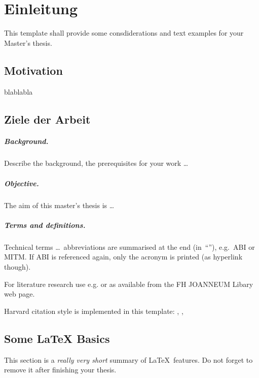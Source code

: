 \chapter{Einleitung}\label{chap:introduction}
\chapterstart

This template shall provide some consdiderations and text examples for your Master's thesis.
\section{Motivation}
blablabla
\section{Ziele der Arbeit}
\paragraph{Background.}
Describe the background, the prerequisites for your work \ldots


\paragraph{Objective.}
The aim of this master's thesis is \ldots


\paragraph{Terms and definitions.}
Technical terms \ldots\ abbreviations are summarised at the end (in~``''), e.g.\ \ac{ABI} or \ac{MITM}. If \ac{ABI} is referenced again, only the acronym is printed (as hyperlink though).

For literature research use e.g.  \parencite{acm:diglibrary} or  \parencite{ieee:xplore} as available from the FH JOANNEUM Libary web page.

Harvard citation style is implemented in this template: \cite{bla}, \citet{Fernandez-Mir:2011:SRA:2188496.2188506}, \citet{Li:2008:TRP:2043628.2043631}


\section{Some \LaTeX{} Basics}
This section is a \textit{really very short} summary of \LaTeX\ features. Do not forget to remove it after finishing your thesis.

